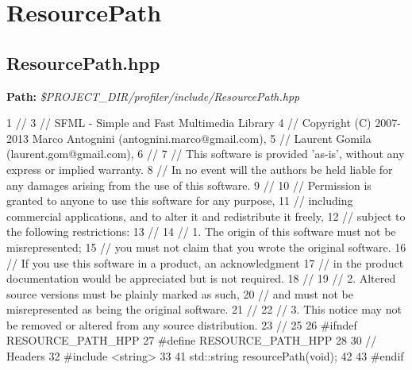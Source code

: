  \hypertarget{_benchmark_program_BenchmarkProgramResourcePath}{}\section{Resource\+Path}\label{_benchmark_program_BenchmarkProgramResourcePath}
\hypertarget{_benchmark_program_BenchmarkProgramResourcePath_h}{}\subsection{Resource\+Path.\+hpp}\label{_benchmark_program_BenchmarkProgramResourcePath_h}
{\bfseries Path\+:} {\itshape \$\+P\+R\+O\+J\+E\+C\+T\+\_\+\+D\+I\+R/profiler/include/\+Resource\+Path.hpp} 
\begin{DoxyCodeInclude}
1 \textcolor{comment}{//}
3 \textcolor{comment}{// SFML - Simple and Fast Multimedia Library}
4 \textcolor{comment}{// Copyright (C) 2007-2013 Marco Antognini (antognini.marco@gmail.com),}
5 \textcolor{comment}{//                         Laurent Gomila (laurent.gom@gmail.com),}
6 \textcolor{comment}{//}
7 \textcolor{comment}{// This software is provided 'as-is', without any express or implied warranty.}
8 \textcolor{comment}{// In no event will the authors be held liable for any damages arising from the use of this software.}
9 \textcolor{comment}{//}
10 \textcolor{comment}{// Permission is granted to anyone to use this software for any purpose,}
11 \textcolor{comment}{// including commercial applications, and to alter it and redistribute it freely,}
12 \textcolor{comment}{// subject to the following restrictions:}
13 \textcolor{comment}{//}
14 \textcolor{comment}{// 1. The origin of this software must not be misrepresented;}
15 \textcolor{comment}{//    you must not claim that you wrote the original software.}
16 \textcolor{comment}{//    If you use this software in a product, an acknowledgment}
17 \textcolor{comment}{//    in the product documentation would be appreciated but is not required.}
18 \textcolor{comment}{//}
19 \textcolor{comment}{// 2. Altered source versions must be plainly marked as such,}
20 \textcolor{comment}{//    and must not be misrepresented as being the original software.}
21 \textcolor{comment}{//}
22 \textcolor{comment}{// 3. This notice may not be removed or altered from any source distribution.}
23 \textcolor{comment}{//}
25 \textcolor{comment}{}
26 \textcolor{preprocessor}{#ifndef RESOURCE\_PATH\_HPP}
27 \textcolor{preprocessor}{#define RESOURCE\_PATH\_HPP}
28 
30 \textcolor{comment}{// Headers}
32 \textcolor{comment}{}\textcolor{preprocessor}{#include <string>}
33 
41 std::string resourcePath(\textcolor{keywordtype}{void});
42 
43 \textcolor{preprocessor}{#endif}
\end{DoxyCodeInclude}
